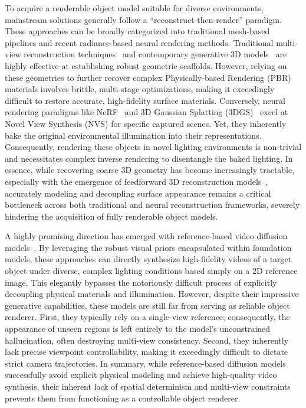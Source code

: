 \documentclass[runningheads]{llncs}
\begin{document}
To acquire a renderable object model suitable for diverse environments, mainstream solutions generally follow a ``reconstruct-then-render'' paradigm. These approaches can be broadly categorized into traditional mesh-based pipelines and recent radiance-based neural rendering methods. Traditional multi-view reconstruction techniques~\cite{schoenberger2016mvs,schoenberger2016sfm,pan2024glomap} and contemporary generative 3D models~\cite{hunyuan3d,trellis,reconviagen,triposg} are highly effective at establishing robust geometric scaffolds. However, relying on these geometries to further recover complex Physically-based Rendering (PBR) materials involves brittle, multi-stage optimizations, making it exceedingly difficult to restore accurate, high-fidelity surface materials. Conversely, neural rendering paradigms like NeRF~\cite{nerf} and 3D Gaussian Splatting (3DGS)~\cite{3dgs} excel at Novel View Synthesis (NVS) for specific captured scenes. Yet, they inherently bake the original environmental illumination into their representations. Consequently, rendering these objects in novel lighting environments is non-trivial and necessitates complex inverse rendering to disentangle the baked lighting. In essence, while recovering coarse 3D geometry has become increasingly tractable, especially with the emergence of feedforward 3D reconstruction models~\cite{anysplat,volsplat,vggt,pi3,gen3r,flashworld,mvsplat}, accurately modeling and decoupling surface appearance remains a critical bottleneck across both traditional and neural reconstruction frameworks, severely hindering the acquisition of fully renderable object models.

A highly promising direction has emerged with reference-based video diffusion models~\cite{phantom, magref, storymem, skyreels}. By leveraging the robust visual priors encapsulated within foundation models, these approaches can directly synthesize high-fidelity videos of a target object under diverse, complex lighting conditions based simply on a 2D reference image. This elegantly bypasses the notoriously difficult process of explicitly decoupling physical materials and illumination. However, despite their impressive generative capabilities, these models are still far from serving as reliable object renderer. First, they typically rely on a single-view reference; consequently, the appearance of unseen regions is left entirely to the model's unconstrained hallucination, often destroying multi-view consistency. Second, they inherently lack precise viewpoint controllability, making it exceedingly difficult to dictate strict camera trajectories. In summary, while reference-based diffusion models successfully avoid explicit physical modeling and achieve high-quality video synthesis, their inherent lack of spatial determinism and multi-view constraints prevents them from functioning as a controllable object renderer.
\end{document}
